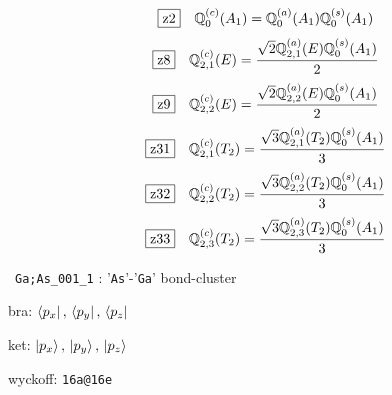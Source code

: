 \documentclass[fleqn,10pt,landscape]{jsarticle}
\begin{document}
\begin{dmath*}
\hspace*{3mm}\fbox{z2}\quad \mathbb{Q}_{0}^{(c)}(A_{1})=\mathbb{Q}_{0}^{(a)}(A_{1}) \mathbb{Q}_{0}^{(s)}(A_{1})
\end{dmath*}
\begin{dmath*}
\hspace*{3mm}\fbox{z8}\quad \mathbb{Q}_{2,1}^{(c)}(E)=\frac{\sqrt{2} \mathbb{Q}_{2,1}^{(a)}(E) \mathbb{Q}_{0}^{(s)}(A_{1})}{2}
\end{dmath*}
\begin{dmath*}
\hspace*{3mm}\fbox{z9}\quad \mathbb{Q}_{2,2}^{(c)}(E)=\frac{\sqrt{2} \mathbb{Q}_{2,2}^{(a)}(E) \mathbb{Q}_{0}^{(s)}(A_{1})}{2}
\end{dmath*}
\begin{dmath*}
\hspace*{3mm}\fbox{z31}\quad \mathbb{Q}_{2,1}^{(c)}(T_{2})=\frac{\sqrt{3} \mathbb{Q}_{2,1}^{(a)}(T_{2}) \mathbb{Q}_{0}^{(s)}(A_{1})}{3}
\end{dmath*}
\begin{dmath*}
\hspace*{3mm}\fbox{z32}\quad \mathbb{Q}_{2,2}^{(c)}(T_{2})=\frac{\sqrt{3} \mathbb{Q}_{2,2}^{(a)}(T_{2}) \mathbb{Q}_{0}^{(s)}(A_{1})}{3}
\end{dmath*}
\begin{dmath*}
\hspace*{3mm}\fbox{z33}\quad \mathbb{Q}_{2,3}^{(c)}(T_{2})=\frac{\sqrt{3} \mathbb{Q}_{2,3}^{(a)}(T_{2}) \mathbb{Q}_{0}^{(s)}(A_{1})}{3}
\end{dmath*}
\vspace{5mm}

\noindent\textbullet\, \texttt{Ga;As_001_1} : '\texttt{As}'-'\texttt{Ga}' bond-cluster

\noindent\quad * bra: $\bra{p_{x}},\, \bra{p_{y}},\, \bra{p_{z}}$

\noindent\quad * ket: $\ket{p_{x}},\, \ket{p_{y}},\, \ket{p_{z}}$

\noindent\quad * wyckoff: \texttt{16a@16e}
\end{document}
